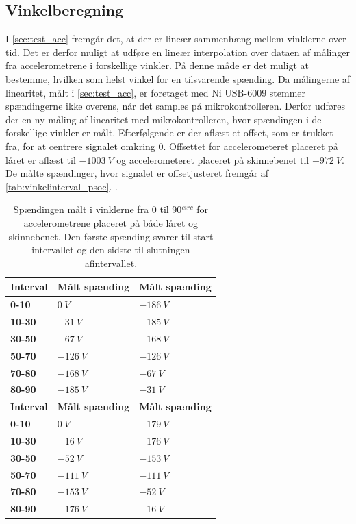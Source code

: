 \subsection{Vinkelberegning}\label{sec:imp_vinkler}
I \autoref{sec:test_acc} fremgår det, at der er lineær sammenhæng mellem vinklerne over tid. Det er derfor muligt at udføre en lineær interpolation over dataen af målinger fra accelerometrene i forskellige vinkler. På denne måde er det muligt at bestemme, hvilken som helst vinkel for en tilsvarende spænding. Da målingerne af linearitet, målt i \autoref{sec:test_acc}, er foretaget med Ni USB-6009 stemmer spændingerne ikke overens, når det samples på mikrokontrolleren. Derfor udføres der en ny måling af linearitet med mikrokontrolleren, hvor spændingen i de forskellige vinkler er målt. Efterfølgende er der aflæst et offset, som er trukket fra, for at centrere signalet omkring 0. Offsettet for accelerometeret placeret på låret er aflæst til $-1003~V$ og accelerometeret placeret på skinnebenet til $-972~V$. De målte spændinger, hvor signalet er offsetjusteret fremgår af \autoref{tab:vinkelinterval_psoc}. .

\begin{table}[H]
	\centering
	\begin{tabular}{|l|l|l|}
	\textbf{Interval} & \textbf{Målt spænding} & \textbf{Målt spænding} 	\\ \hline	
    \textbf{0-10} 			& $0~V$							& $-186~V$   \\ \hline
    \textbf{10-30} 			& $-31~V$						& $-185~V$	\\ \hline
    \textbf{30-50} 			& $-67~V$						& $-168~V$	\\ \hline
    \textbf{50-70} 			& $-126~V$						& $-126~V$	\\ \hline
    \textbf{70-80} 			& $-168~V$						& $-67~V$	\\ \hline
    \textbf{80-90} 			& $-185~V$						& $-31~V$	\\ \hline
    	\textbf{Interval} & \textbf{Målt spænding} & \textbf{Målt spænding} 		\\ \hline	
    \textbf{0-10}			& $0~V$ 							& $-179~V$	    \\ \hline
    \textbf{10-30}			& $-16~V$						& $-176~V$	 	\\ \hline
    \textbf{30-50}			& $-52~V$						& $-153~V$		\\ \hline
    \textbf{50-70}			& $-111~V$						& $-111~V$		\\ \hline
    \textbf{70-80}			& $-153~V$						& $-52~V$	 	\\ \hline
     \textbf{80-90}			& $-176~V$						& $-16~V$	 	\\ \hline
	\end{tabular}
	\caption{Spændingen målt i vinklerne fra 0 til 90$^{circ}$ for accelerometrene placeret på både låret og skinnebenet. Den første spænding svarer til start intervallet og den sidste til slutningen afintervallet.}
	\label{tab:vinkelinterval_psoc}
\end{table}

